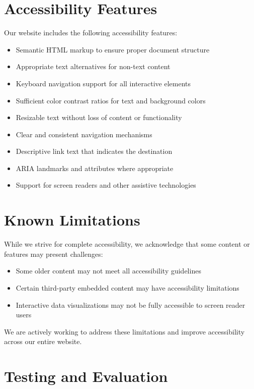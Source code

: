 \documentclass[11pt]{article}
\begin{document}
\section{Accessibility Features}

Our website includes the following accessibility features:

\begin{itemize}
  \item Semantic HTML markup to ensure proper document structure
  \item Appropriate text alternatives for non-text content
  \item Keyboard navigation support for all interactive elements
  \item Sufficient color contrast ratios for text and background colors
  \item Resizable text without loss of content or functionality
  \item Clear and consistent navigation mechanisms
  \item Descriptive link text that indicates the destination
  \item ARIA landmarks and attributes where appropriate
  \item Support for screen readers and other assistive technologies
\end{itemize}

\section{Known Limitations}

While we strive for complete accessibility, we acknowledge that some content or features may present challenges:

\begin{itemize}
  \item Some older content may not meet all accessibility guidelines
  \item Certain third-party embedded content may have accessibility limitations
  \item Interactive data visualizations may not be fully accessible to screen reader users
\end{itemize}

We are actively working to address these limitations and improve accessibility across our entire website.

\section{Testing and Evaluation}
\end{document}
